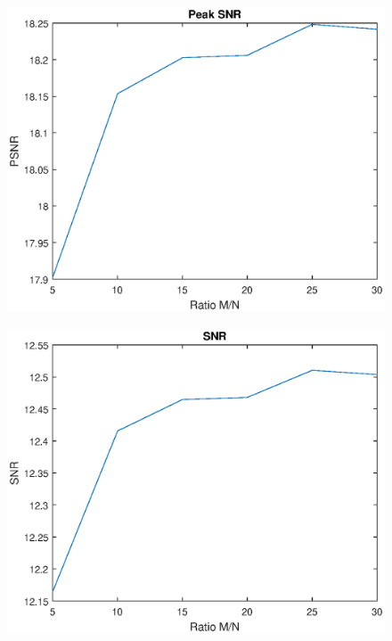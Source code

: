\begin{figure}[H]
    \centering
\begin{minipage}[t]{0.49\textwidth}
    \includegraphics[width=1\textwidth]{result/homo/hom_PSNR.eps}
    \label{fig:hom_psnr}
\end{minipage}
\begin{minipage}[t]{0.49\textwidth}
    \includegraphics[width = \textwidth]{result/homo/hom_SNR.eps}
    \label{fig:hom_snr}

\end{minipage}
\end{figure}
